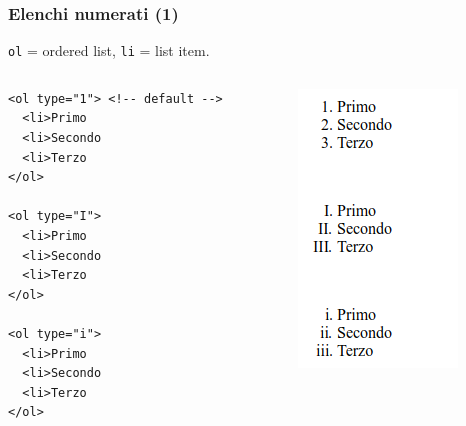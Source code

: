 \documentclass[]{beamer}
\begin{document}
\begin{frame}[fragile]
\frametitle{Elenchi numerati (1)}
\texttt{ol} = ordered list, \texttt{li} = list item.
\begin{columns}
\begin{column}{0.45\textwidth}
\begin{scriptsize}
\begin{verbatim}
<ol type="1"> <!-- default -->
  <li>Primo
  <li>Secondo
  <li>Terzo
</ol>

<ol type="I">
  <li>Primo
  <li>Secondo
  <li>Terzo
</ol>

<ol type="i">
  <li>Primo
  <li>Secondo
  <li>Terzo
</ol>
\end{verbatim}
\end{scriptsize}
\end{column}
\begin{column}{0.45\textwidth}
\begin{figure}
\includegraphics[width=0.4\columnwidth]{screenshots/elenconumerato1.png}
\end{figure}
\end{column}
\end{columns}
\end{frame}
\end{document}
